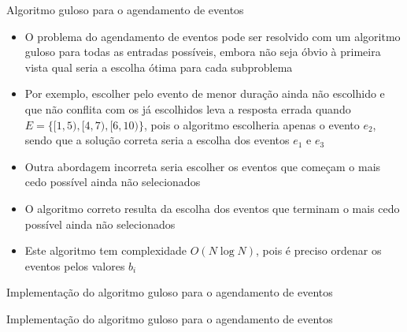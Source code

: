 \begin{frame}[fragile]{Algoritmo guloso para o agendamento de eventos}

    \begin{itemize}
        \item O problema do agendamento de eventos pode ser resolvido com um algoritmo guloso
            para todas as entradas possíveis, embora não seja óbvio à primeira vista qual seria
            a escolha ótima para cada subproblema

        \item Por exemplo, escolher pelo evento de menor duração ainda não escolhido e que não
            conflita com os já escolhidos leva a resposta errada quando $E = \lbrace 
                [1, 5), [4, 7), [6, 10)\rbrace$, pois o algoritmo escolheria apenas o evento 
            $e_2$, sendo que a solução correta seria a escolha dos eventos $e_1$ e $e_3$

        \item Outra abordagem incorreta seria escolher os eventos que começam o mais cedo possível
            ainda não selecionados

        \item O algoritmo correto resulta da escolha dos eventos que terminam o mais cedo
            possível ainda não selecionados

        \item Este algoritmo tem complexidade $O(N\log N)$, pois é preciso ordenar os eventos
            pelos valores $b_i$
    \end{itemize}

\end{frame}

\begin{frame}[fragile]{Implementação do algoritmo guloso para o agendamento de eventos}
\end{frame}

\begin{frame}[fragile]{Implementação do algoritmo guloso para o agendamento de eventos}
\end{frame}
